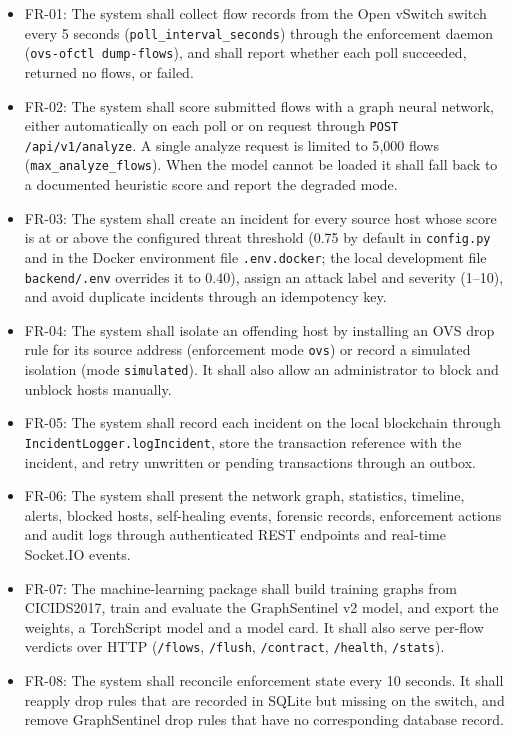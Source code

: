 \documentclass[12pt,a4paper]{report}
\begin{document}
\begin{itemize}
    \item {FR-01: The system shall collect flow records from the Open vSwitch switch every 5 seconds (\texttt{poll\_interval\_seconds}) through the enforcement daemon (\texttt{ovs-ofctl dump-flows}), and shall report whether each poll succeeded, returned no flows, or failed.}

    \item {FR-02: The system shall score submitted flows with a graph neural network, either automatically on each poll or on request through \texttt{POST /api/v1/analyze}. A single analyze request is limited to 5{,}000 flows (\texttt{max\_analyze\_flows}). When the model cannot be loaded it shall fall back to a documented heuristic score and report the degraded mode.}

    \item {FR-03: The system shall create an incident for every source host whose score is at or above the configured threat threshold (0.75 by default in \texttt{config.py} and in the Docker environment file \texttt{.env.docker}; the local development file \texttt{backend/.env} overrides it to 0.40), assign an attack label and severity (1--10), and avoid duplicate incidents through an idempotency key.}

    \item {FR-04: The system shall isolate an offending host by installing an OVS drop rule for its source address (enforcement mode \texttt{ovs}) or record a simulated isolation (mode \texttt{simulated}). It shall also allow an administrator to block and unblock hosts manually.}

    \item {FR-05: The system shall record each incident on the local blockchain through \texttt{IncidentLogger.logIncident}, store the transaction reference with the incident, and retry unwritten or pending transactions through an outbox.}

    \item {FR-06: The system shall present the network graph, statistics, timeline, alerts, blocked hosts, self-healing events, forensic records, enforcement actions and audit logs through authenticated REST endpoints and real-time Socket.IO events.}

    \item {FR-07: The machine-learning package shall build training graphs from CICIDS2017, train and evaluate the GraphSentinel v2 model, and export the weights, a TorchScript model and a model card. It shall also serve per-flow verdicts over HTTP (\texttt{/flows}, \texttt{/flush}, \texttt{/contract}, \texttt{/health}, \texttt{/stats}).}

    \item {FR-08: The system shall reconcile enforcement state every 10 seconds. It shall reapply drop rules that are recorded in SQLite but missing on the switch, and remove GraphSentinel drop rules that have no corresponding database record.}
\end{itemize}
\end{document}
